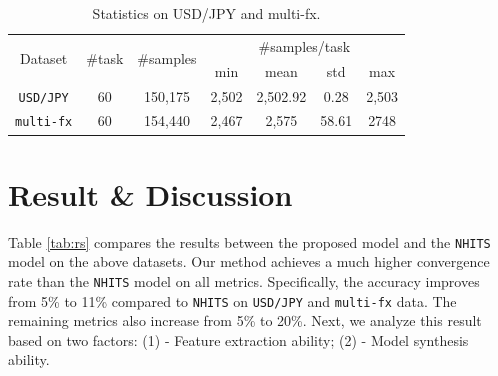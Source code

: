 \documentclass[aps,prb,groupedaddress,twocolumn,showpacs,dvipdfmx,superscriptaddress,pdftex]{revtex4-2}
\begin{document}
\begin{table}
    \centering
    \caption{Statistics on USD/JPY and multi-fx.}
    \label{tab:stat_}
    \begin{tabular}{ccccccc}
    \toprule
    \multirow{2}{*}{Dataset} & \multirow{2}{*}{\#task} & \multirow{2}{*}{\#samples} & \multicolumn{4}{c}{\#samples/task}  \\
    \cline{4-7}
                             &                         &                            & min & mean  & std   & max             \\
    \hline
    \Verb|USD/JPY|           & 60                      & 150,175                     & 2,502 & 2,502.92 & 0.28 & 2,503           \\
    \Verb|multi-fx|          & 60                      & 154,440                     & 2,467 & 2,575 & 58.61   & 2748           \\
    \bottomrule
    \end{tabular}
\end{table}

\section{Result \& Discussion}
\label{sec.results}



Table \ref{tab:rs} compares the results between the proposed model and the \verb|NHITS| model on the above datasets. Our method achieves a much higher convergence rate than the \verb|NHITS| model on all metrics. Specifically, the accuracy improves from 5\% to 11\% compared to \verb|NHITS| on \verb|USD/JPY| and \verb|multi-fx| data. The remaining metrics also increase from 5\% to 20\%. Next, we analyze this result based on two factors: (1) - Feature extraction ability; (2) - Model synthesis ability.
\end{document}
